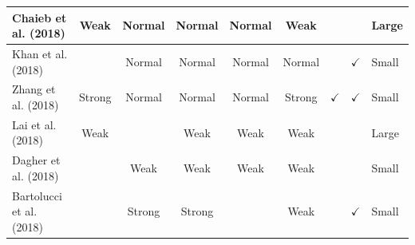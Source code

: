 \documentclass[../access.tex]{subfiles}
\begin{document}
\begin{table}[htbp]
\begin{adjustwidth}{-1cm}{}
\begin{tabular}{m{4.4cm} c c c c c c c >{\centering\arraybackslash}m{0.7cm}}
            \hline
            \footnotesize{Chaieb et al. (2018) \cite{Chaieb2018}}               & {Weak}                                                                                            & {Normal}                                         & {Normal}               & {Normal}                     & {Weak}                    & {}                      & {}                        & \footnotesize{Large} \\
            \hline
            \footnotesize{Khan et al. (2018) \cite{Khan2018}}                   & {}                                                                                                & {Normal}                                         & {Normal}               & {Normal}                     & {Normal}                  & {}                      & $ \checkmark $            & \footnotesize{Small} \\
            \hline
            \footnotesize{Zhang et al. (2018) \cite{Zhang2018}}                 & {Strong}                                                                                          & {Normal}                                         & {Normal}               & {Normal}                     & {Strong}                  & $ \checkmark $          & $ \checkmark $            & \footnotesize{Small} \\
            \hline
            \footnotesize{Lai et al. (2018) \cite{Lai2018}}                     & {Weak}                                                                                            & {}                                               & {Weak}                 & {Weak}                       & {Weak}                    & {}                      & {}                        & \footnotesize{Large} \\
            \hline
            \footnotesize{Dagher et al. (2018) \cite{Dagher2018}}               & {}                                                                                                & {Weak}                                           & {Weak}                 & {Weak}                       & {Weak}                    & {}                      & {}                        & \footnotesize{Small} \\
            \hline
            \footnotesize{Bartolucci et al. (2018) \cite{Bartolucci2018}}       & {}                                                                                                & {Strong}                                         & {Strong}               & {}                           & {Weak}                    & {}                      & $ \checkmark $            & \footnotesize{Small} \\

\end{tabular}
\end{adjustwidth}
\end{table}
\end{document}

